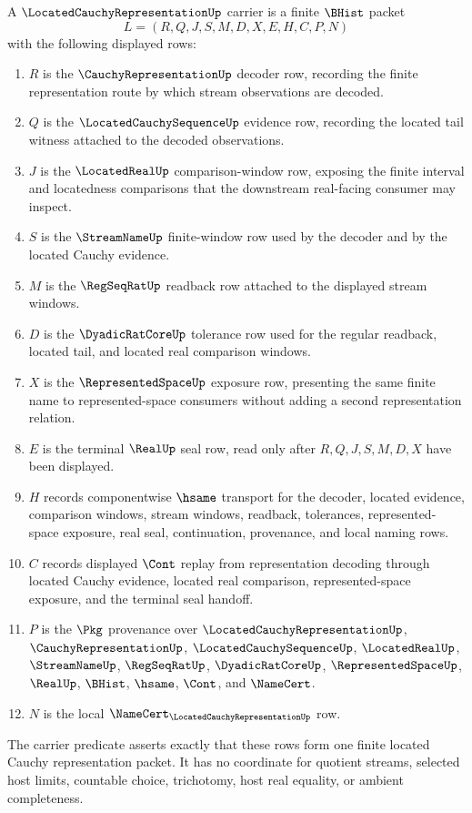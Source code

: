 \begin{definition}
\label{def:located-cauchy-representation-carrier}
A $\LocatedCauchyRepresentationUp$ carrier is a finite $\BHist$ packet
$$
L=(R,Q,J,S,M,D,X,E,H,C,P,N)
$$
with the following displayed rows:
\begin{enumerate}
\item $R$ is the $\CauchyRepresentationUp$ decoder row, recording the finite representation route by which stream observations are decoded.
\item $Q$ is the $\LocatedCauchySequenceUp$ evidence row, recording the located tail witness attached to the decoded observations.
\item $J$ is the $\LocatedRealUp$ comparison-window row, exposing the finite interval and locatedness comparisons that the downstream real-facing consumer may inspect.
\item $S$ is the $\StreamNameUp$ finite-window row used by the decoder and by the located Cauchy evidence.
\item $M$ is the $\RegSeqRatUp$ readback row attached to the displayed stream windows.
\item $D$ is the $\DyadicRatCoreUp$ tolerance row used for the regular readback, located tail, and located real comparison windows.
\item $X$ is the $\RepresentedSpaceUp$ exposure row, presenting the same finite name to represented-space consumers without adding a second representation relation.
\item $E$ is the terminal $\RealUp$ seal row, read only after $R,Q,J,S,M,D,X$ have been displayed.
\item $H$ records componentwise $\hsame$ transport for the decoder, located evidence, comparison windows, stream windows, readback, tolerances, represented-space exposure, real seal, continuation, provenance, and local naming rows.
\item $C$ records displayed $\Cont$ replay from representation decoding through located Cauchy evidence, located real comparison, represented-space exposure, and the terminal seal handoff.
\item $P$ is the $\Pkg$ provenance over $\LocatedCauchyRepresentationUp$, $\CauchyRepresentationUp$, $\LocatedCauchySequenceUp$, $\LocatedRealUp$, $\StreamNameUp$, $\RegSeqRatUp$, $\DyadicRatCoreUp$, $\RepresentedSpaceUp$, $\RealUp$, $\BHist$, $\hsame$, $\Cont$, and $\NameCert$.
\item $N$ is the local $\NameCert_{\LocatedCauchyRepresentationUp}$ row.
\end{enumerate}
The carrier predicate asserts exactly that these rows form one finite located Cauchy representation packet. It has no coordinate for quotient streams, selected host limits, countable choice, trichotomy, host real equality, or ambient completeness.
\end{definition}

